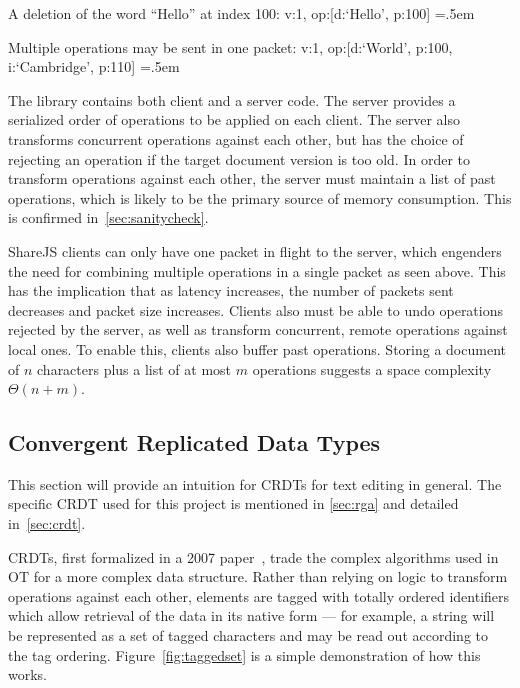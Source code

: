 \documentclass[12pt,a4paper,twoside,openright]{report}
\newenvironment{lcverbatim}
 {\SaveVerbatim{cverb}}
 {\endSaveVerbatim
  \flushleft\fboxrule=0pt\fboxsep=.5em
  \colorbox{cverbbg}{%
    \makebox[\dimexpr\linewidth-2\fboxsep][l]{\BUseVerbatim{cverb}}%
  }
  \endflushleft
}
\begin{document}
	A deletion of the word ``Hello'' at index 100:
\begin{lcverbatim}
{v:1, op:[{d:`Hello', p:100}]}
\end{lcverbatim}

	Multiple operations may be sent in one packet:
\begin{lcverbatim}
{v:1, op:[{d:`World', p:100}, {i:`Cambridge', p:110}]}
\end{lcverbatim}

\vspace{5mm}

	The library contains both client and a server code. The server provides a serialized order of operations to be applied on each client. The server also transforms concurrent operations against each other, but has the choice of rejecting an operation if the target document version is too old. In order to transform operations against each other, the server must maintain a list of past operations, which is likely to be the primary source of memory consumption. This is confirmed in~\cref{sec:sanitycheck}.
	
	ShareJS clients can only have one packet in flight to the server, which engenders the need for combining multiple operations in a single packet as seen above. This has the implication that as latency increases, the number of packets sent decreases and packet size increases. Clients also must be able to undo operations rejected by the server, as well as transform concurrent, remote operations against local ones. To enable this, clients also buffer past operations. Storing a document of $n$ characters plus a list of at most $m$ operations suggests a space complexity $\Theta (n + m)$.


	\subsection{Convergent Replicated Data Types} \label{sec:crdtoverview}
	
	This section will provide an intuition for CRDTs for text editing in general. The specific CRDT used for this project is mentioned in \cref{sec:rga} and detailed in~\cref{sec:crdt}.

	CRDTs, first formalized in a 2007 paper~\cite{shapiro2007}, trade the complex algorithms used in OT for a more complex data structure. Rather than relying on logic to transform operations against each other, elements are tagged with totally ordered identifiers which allow retrieval of the data in its native form --- for example, a string will be represented as a set of tagged characters and may be read out according to the tag ordering. Figure~\ref{fig:taggedset} is a simple demonstration of how this works. 
	
\end{document}
